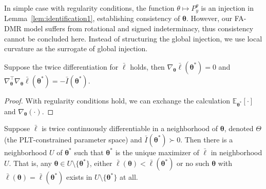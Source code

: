 In simple case with regularity conditions, the function $\theta \mapsto P^{\theta}_{y}$ is an injection in Lemma~\ref{lem:identification1}, establishing consistency of $\bm{\theta}$. However, our FA-DMR model suffers from rotational and signed indeterminacy, thus consistency cannot be concluded here. Instead of structuring the global injection, we use local curvature as the surrogate of global injection.

\begin{lemma}
    Suppose the twice differentiation for $\bar{\ell}$ holds, then $\nabla_{\bm{\theta}}\bar{\ell}(\bm{\theta}^{*})=0$ and $\nabla_{\bm{\theta}}^{\top}\nabla_{\bm{\theta}}\bar{\ell}(\bm{\theta}^{*})=-\bar{I}(\bm{\theta}^{*})$.
    \label{lem:identification2}
\end{lemma}

\begin{proof}
    With regularity conditions hold, we can exchange the calculation $\mathbb{E}_{\bm{\theta}^{*}}[\cdot]$ and $\nabla_{\bm{\theta}}(\cdot)$.
\end{proof}

\begin{theorem}
    Suppose $\bar{\ell}$ is twice continuously differentiable in a neighborhood of $\bm{\theta}$, denoted $\Theta$ (the PLT-constrained parameter space) and $\bar{I}(\bm{\theta}^{*})\succ 0$. Then there is a neighborhood $U$ of $\bm{\theta}^{*}$ such that $\bm{\theta}^{*}$ is the unique maximizer of $\bar{\ell}$ in neighborhood $U$. That is, any $\bm{\theta}\in U\setminus \{\bm{\theta}^{*} \}$, either $\bar{\ell}(\bm{\theta})<\bar{\ell}(\bm{\theta}^{*})$ or no such $\bm{\theta}$ with $\bar{\ell}(\bm{\theta})=\bar{\ell}(\bm{\theta}^{*})$ exists in $U\setminus \{\bm{\theta}^{*}\}$ at all.
\end{theorem}

